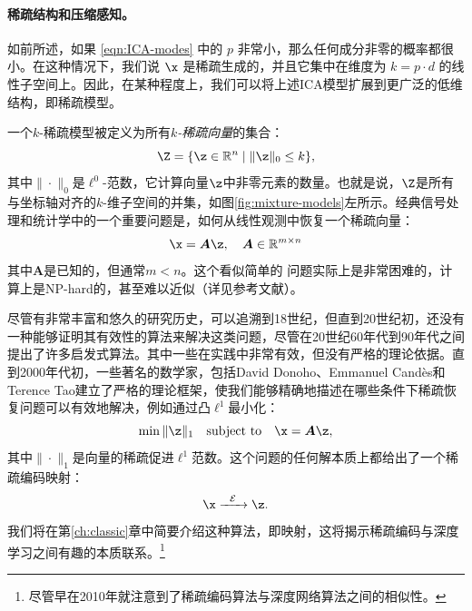 \documentclass[../../book-main.tex]{subfiles}
\begin{document}
\paragraph{稀疏结构和压缩感知。}
如前所述，如果 \eqref{eqn:ICA-modes} 中的 $p$ 非常小，那么任何成分非零的概率都很小。在这种情况下，我们说 $\x$ 是稀疏生成的，并且它集中在维度为 $k = p \cdot d$ 的线性子空间上。因此，在某种程度上，我们可以将上述ICA模型扩展到更广泛的低维结构，即稀疏模型。

一个$k$-稀疏模型被定义为所有{\em $k$-稀疏向量}的集合：
\begin{equation}
    \Z = \{\z \in \mathbb{R}^n \mid \|\z\|_0 \le k\},
\end{equation}
其中$\| \cdot \|_0$是$\ell^0$-范数，它计算向量$\z$中非零元素的数量。也就是说，$\Z$是所有与坐标轴对齐的$k$-维子空间的并集，如图\ref{fig:mixture-models}左所示。经典信号处理和统计学中的一个重要问题是，如何从线性观测中恢复一个稀疏向量：
\begin{equation}
    \x = \boldsymbol{A} \z, \quad \boldsymbol{A} \in \mathbb{R}^{m\times n}
    \label{eqn:sparse-model}
\end{equation}
其中$\boldsymbol{A}$是已知的，但通常$m < n$。这个看似简单的 问题实际上是非常困难的，计算上是NP-hard的，甚至难以近似（详见参考文献\cite{Wright-Ma-2022}）。

尽管有非常丰富和悠久的研究历史，可以追溯到18世纪\cite{Boscovichca1750}，但直到20世纪初，还没有一种能够证明其有效性的算法来解决这类问题，尽管在20世纪60年代到90年代之间提出了许多启发式算法。其中一些在实践中非常有效，但没有严格的理论依据。直到2000年代初，一些著名的数学家，包括David Donoho、Emmanuel Cand\`{e}s和Terence Tao\cite{donoho2005neighborly,Candes2005,CandesE2005-IT}建立了严格的理论框架，使我们能够精确地描述在哪些条件下稀疏恢复问题可以有效地解决，例如通过凸$\ell^1$最小化：
\begin{equation}
    \min \|\z\|_1 \quad \mbox{subject to} \quad \x = \boldsymbol{A}\z,
\end{equation}
其中$\|\cdot \|_1$是向量的稀疏促进$\ell^1$范数。这个问题的任何解本质上都给出了一个稀疏编码映射：
\begin{equation}
    \x   \xrightarrow{\hspace{2mm} \mathcal{E} \hspace{2mm}}  \z.
       \label{eqn:decoding-sparse}
\end{equation}
我们将在第\ref{ch:classic}章中简要介绍这种算法，即映射，这将揭示稀疏编码与深度学习之间有趣的本质联系。\footnote{尽管早在2010年就注意到了稀疏编码算法与深度网络算法之间的相似性\cite{gregor2010learning}。}
\end{document}
